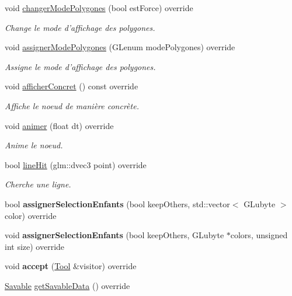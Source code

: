 \begin{DoxyCompactItemize}
void \hyperlink{group__inf2990_ga90bb01067866438b80d081967c133b81}{changer\-Mode\-Polygones} (bool est\-Force) override
\begin{DoxyCompactList}\small\item\em Change le mode d'affichage des polygones. \end{DoxyCompactList}\item 
void \hyperlink{group__inf2990_ga5caf8a3f9e06915463abdff7a473d95f}{assigner\-Mode\-Polygones} (G\-Lenum mode\-Polygones) override
\begin{DoxyCompactList}\small\item\em Assigne le mode d'affichage des polygones. \end{DoxyCompactList}\item 
void \hyperlink{group__inf2990_ga023450b00e424ff3600a93a6c844b4ad}{afficher\-Concret} () const override
\begin{DoxyCompactList}\small\item\em Affiche le noeud de manière concrète. \end{DoxyCompactList}\item 
void \hyperlink{group__inf2990_gac641c70147959a57b698854e016ff929}{animer} (float dt) override
\begin{DoxyCompactList}\small\item\em Anime le noeud. \end{DoxyCompactList}\item 
bool \hyperlink{group__inf2990_gaf1aff36b4974423ea872caedd0d5b129}{line\-Hit} (glm\-::dvec3 point) override
\begin{DoxyCompactList}\small\item\em Cherche une ligne. \end{DoxyCompactList}\item 
\hypertarget{group__inf2990_ga021e45b8fc867b1ccad256c0eb5f9ec7}{bool {\bfseries assigner\-Selection\-Enfants} (bool keep\-Others, std\-::vector$<$ G\-Lubyte $>$ color) override}\label{group__inf2990_ga021e45b8fc867b1ccad256c0eb5f9ec7}

\item 
\hypertarget{group__inf2990_gac08da538d114a6afbb5f2b4a900a6e54}{void {\bfseries assigner\-Selection\-Enfants} (bool keep\-Others, G\-Lubyte $\ast$colors, unsigned int size) override}\label{group__inf2990_gac08da538d114a6afbb5f2b4a900a6e54}

\item 
\hypertarget{group__inf2990_ga0b60c180726f3a0501f42bc70bc0c52e}{void {\bfseries accept} (\hyperlink{class_tool}{Tool} \&visitor) override}\label{group__inf2990_ga0b60c180726f3a0501f42bc70bc0c52e}

\item 
\hyperlink{class_savable}{Savable} \hyperlink{group__inf2990_ga3fefd2b70f384f82cb6319f468c01a63}{get\-Savable\-Data} () override
\end{DoxyCompactItemize}
